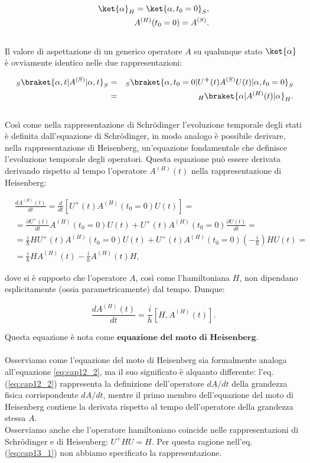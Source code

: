 \begin{align}
\ket{\alpha}_H = \ket{\alpha, t_0 = 0}_S, \\ \nonumber
A^{(H)}(t_0 = 0) = A^{(S)}.
\end{align}
\\
\noindent Il valore di aspettazione di un generico operatore $A$ su qualunque stato $\ket{\alpha}$ è ovviamente identico nelle due rappresentazioni:

\begin{eqnarray}
~_S\braket{\alpha,t|A^{(S)}|\alpha,t}_S &=& _S\braket{\alpha, t_0=0|U^\textbf{+}(t) A^{(S)}U(t)|\alpha,t_0=0}_S \nonumber \\
&=&~_H\braket{\alpha|A^{(H)}(t)|\alpha}_H.
\end{eqnarray}
\\
\noindent Così come nella rappresentazione di Schrödinger l'evoluzione temporale degli stati è definita dall'equazione di Schrödinger, in modo analogo è possibile derivare, nella rappresentazione di Heisenberg, un'equazione fondamentale che definisce l'evoluzione temporale degli operatori. Questa equazione può essere derivata derivando rispetto al tempo l'operatore $A^{(H)}(t)$ nella rappresentazione di Heisenberg:

\begin{align}
& \frac{dA^{(H)}(t)}{dt} = \frac{d}{dt}\left[U^\textbf{+}(t) A^{(H)}(t_0=0)U(t)\right] = \nonumber \\
&= \frac{\partial U^\textbf{+}(t)}{dt} A^{(H)}(t_0=0) U(t) + U^\textbf{+}(t) A^{(H)}(t_0=0) \frac{\partial U(t)}{dt} = \nonumber \\
&= \frac{i}{\hbar} H U^\textbf{+}(t) A^{(H)}(t_0=0) U(t) + U^\textbf{+}(t) A^{(H)}(t_0=0) \left(-\frac{i}{h}\right) H U(t) = \nonumber \\
&= \frac{i}{\hbar} H A^{(H)}(t) - \frac{i}{h} A^{(H)}(t) H,
\end{align}

\noindent dove si è supposto che l'operatore $A$, così come l'hamiltoniana $H$, non dipendano esplicitamente (ossia parametricamente) dal tempo. Dunque:

\begin{equation} \label{eq:cap13_1}
\frac{d A^{(H)}(t)}{dt} = \frac{i}{h} \left[H, A^{(H)}(t) \right].
\end{equation}

\noindent Questa equazione è nota come $\textbf{equazione del moto di Heisenberg}$.\\
\\
Osserviamo come l'equazione del moto di Heisenberg sia formalmente analoga all'equazione \ref{eq:cap12_2}, ma il suo significato è alquanto differente: l'eq. (\ref{eq:cap12_2}) rappresenta la definizione dell'operatore $dA/dt$ della grandezza fisica corrispondente $dA/dt$, mentre il primo membro dell'equazione del moto di Heisenberg contiene la derivata rispetto al tempo dell'operatore della grandezza stessa $A$.\\
Osserviamo anche che l'operatore hamiltoniano coincide nelle rappresentazioni di Schrödinger e di Heisenberg: $U^\textbf{+} H U = H$. Per questa ragione nell'eq. (\eqref{eq:cap13_1}) non abbiamo specificato la rappresentazione.
